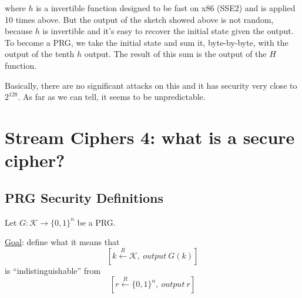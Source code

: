 \documentclass[12pt]{book}
\begin{document}
\begin{center}
{
	}
\end{center}where $h$ is a invertible function designed to be fast on x86 (SSE2) and is applied 10 times above. But the output of the sketch showed above is not random, because $h$ is invertible and it's easy to recover the initial state given the output. To become a PRG, we take the initial state and sum it, byte-by-byte, with the output of the tenth $h$ output. The result of this sum is the output of the $H$ function.

Basically, there are no significant attacks on this and it has security very close to $2^{128}$. As far as we can tell, it seems to be unpredictable.

\newpage
\section{Stream Ciphers 4: what is a secure cipher?}
\subsection{PRG Security Definitions}
Let $G:\mathcal{K}\rightarrow \{0,1\}^{n}$ be a PRG.

\underline{Goal}: define what it means that
$$\left[k\xleftarrow{R}\mathcal{K},\ output\ G(k)\right]$$is ``indistinguishable'' from
$$\left[r\xleftarrow{R}\{0,1\}^{n},\ output\ r\right]$$
\end{document}
